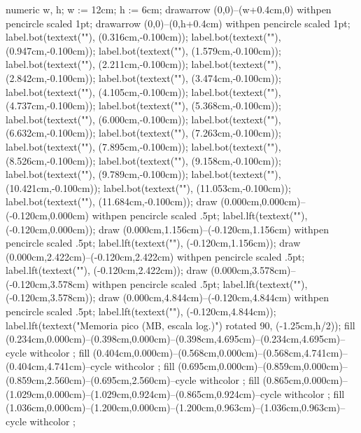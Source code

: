 {\startMPcode
numeric w, h; w := 12cm; h := 6cm;
drawarrow (0,0)--(w+0.4cm,0) withpen pencircle scaled 1pt;
drawarrow (0,0)--(0,h+0.4cm) withpen pencircle scaled 1pt;
label.bot(textext(""), (0.316cm,-0.100cm));
label.bot(textext(""), (0.947cm,-0.100cm));
label.bot(textext(""), (1.579cm,-0.100cm));
label.bot(textext(""), (2.211cm,-0.100cm));
label.bot(textext(""), (2.842cm,-0.100cm));
label.bot(textext(""), (3.474cm,-0.100cm));
label.bot(textext(""), (4.105cm,-0.100cm));
label.bot(textext(""), (4.737cm,-0.100cm));
label.bot(textext(""), (5.368cm,-0.100cm));
label.bot(textext(""), (6.000cm,-0.100cm));
label.bot(textext(""), (6.632cm,-0.100cm));
label.bot(textext(""), (7.263cm,-0.100cm));
label.bot(textext(""), (7.895cm,-0.100cm));
label.bot(textext(""), (8.526cm,-0.100cm));
label.bot(textext(""), (9.158cm,-0.100cm));
label.bot(textext(""), (9.789cm,-0.100cm));
label.bot(textext(""), (10.421cm,-0.100cm));
label.bot(textext(""), (11.053cm,-0.100cm));
label.bot(textext(""), (11.684cm,-0.100cm));
draw (0.000cm,0.000cm)--(-0.120cm,0.000cm) withpen pencircle scaled .5pt;
label.lft(textext(""), (-0.120cm,0.000cm));
draw (0.000cm,1.156cm)--(-0.120cm,1.156cm) withpen pencircle scaled .5pt;
label.lft(textext(""), (-0.120cm,1.156cm));
draw (0.000cm,2.422cm)--(-0.120cm,2.422cm) withpen pencircle scaled .5pt;
label.lft(textext(""), (-0.120cm,2.422cm));
draw (0.000cm,3.578cm)--(-0.120cm,3.578cm) withpen pencircle scaled .5pt;
label.lft(textext(""), (-0.120cm,3.578cm));
draw (0.000cm,4.844cm)--(-0.120cm,4.844cm) withpen pencircle scaled .5pt;
label.lft(textext(""), (-0.120cm,4.844cm));
label.lft(textext("Memoria pico (MB, escala log.)") rotated 90, (-1.25cm,h/2));
fill (0.234cm,0.000cm)--(0.398cm,0.000cm)--(0.398cm,4.695cm)--(0.234cm,4.695cm)--cycle withcolor ;
fill (0.404cm,0.000cm)--(0.568cm,0.000cm)--(0.568cm,4.741cm)--(0.404cm,4.741cm)--cycle withcolor ;
fill (0.695cm,0.000cm)--(0.859cm,0.000cm)--(0.859cm,2.560cm)--(0.695cm,2.560cm)--cycle withcolor ;
fill (0.865cm,0.000cm)--(1.029cm,0.000cm)--(1.029cm,0.924cm)--(0.865cm,0.924cm)--cycle withcolor ;
fill (1.036cm,0.000cm)--(1.200cm,0.000cm)--(1.200cm,0.963cm)--(1.036cm,0.963cm)--cycle withcolor ;
}
